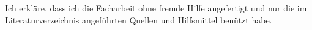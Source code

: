 \vspace{10cm}

Ich erkläre, dass ich die Facharbeit ohne fremde Hilfe angefertigt 
und nur die im Literaturverzeichnis angeführten Quellen und 
Hilfsmittel benützt habe.

\vspace{10cm}

